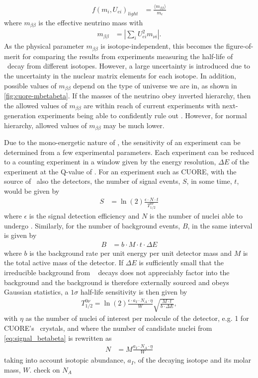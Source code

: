 \begin{align}
        f(m_i, U_{ei})_{light} &= \frac{\langle m_{\beta\beta}\rangle}{m_e}
\end{align}
where $m_{\beta\beta}$ is the effective neutrino mass with
\begin{align}
    m_{\beta\beta}&=|\sum_iU^2_{ei}m_{\nu i}|.
    \label{eq:mbetabeta}
\end{align}
As the physical parameter $m_{\beta\beta}$ is isotope-independent, this becomes the figure-of-merit for comparing the results from experiments measuring the half-life of \zeronubb~decay from different isotopes. However, a large uncertainty is introduced due to the uncertainty in the nuclear matrix elements for each isotope. In addition, possible values of $m_{\beta\beta}$ depend on the type of universe we are in, as shown in \autoref{fig:cuore-mbetabeta}. If the masses of the neutrino obey inverted hierarchy, then the allowed values of $m_{\beta\beta}$ are within reach of current experiments with next-generation experiments being able to confidently rule out \zeronubb. However, for normal hierarchy, allowed values of $m_{\beta\beta}$ may be much lower. 

Due to the mono-energetic nature of \zeronubb, the sensitivity of an experiment can be determined from a few experimental parameters. Each experiment can be reduced to a counting experiment in a window given by the energy resolution, $\Delta E$ of the experiment at the Q-value of \zeronubb. For an experiment such as CUORE, with the source of \zeronubb~also the detectors, the number of signal events, $S$, in some time, $t$, would be given by
\begin{align}
    S &= \ln(2)\frac{\epsilon\cdot N \cdot t}{T^{0\nu}_{1/2}}
    \label{eq:signal_betabeta}
\end{align}
where $\epsilon$ is the signal detection efficiency and $N$ is the number of nuclei able to undergo \zeronubb. Similarly, for the number of background events, $B$, in the same interval is given by
\begin{align}
    B &= b\cdot M \cdot t \cdot \Delta E
    \label{eq:background_betabeta}
\end{align}
where $b$ is the background rate per unit energy per unit detector mass and $M$ is the total active mass of the detector. If $\Delta E$ is sufficiently small that the irreducible background from \twonubb~ decays does not appreciably factor into the background and the background is therefore externally sourced and obeys Gaussian statistics, a $1\sigma$ half-life sensitivity is then given by
\begin{align}
    T^{0\nu}_{1/2}=\ln(2)\frac{\epsilon \cdot a_I \cdot N_A \cdot \eta}{W} \sqrt{\frac{M\cdot t}{b\cdot \Delta E}},
\end{align}
with $\eta$ as the number of nuclei of interest per molecule of the detector, e.g. 1 for CUORE's \teotwo~crystals, and where the number of candidate nuclei from \autoref{eq:signal_betabeta} is rewritten as
\begin{align}
    N &=M\frac{a_I \cdot N_A\cdot \eta}{W}
\end{align}
taking into account isotopic abundance, $a_I$, of the decaying isotope and its molar mass, $W$. \color{red} check on $N_A$ \color{black}

